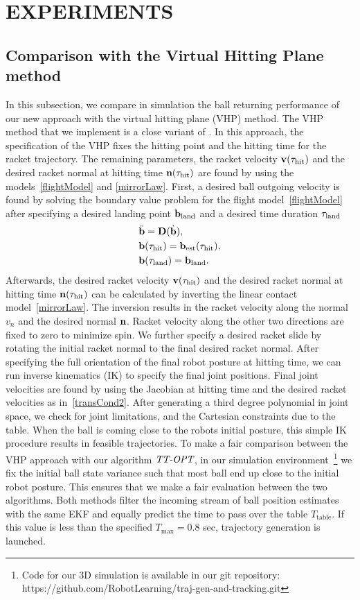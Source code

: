 \section{EXPERIMENTS}\label{results}

\subsection{Comparison with the Virtual Hitting Plane method}

In this subsection, we compare in simulation the ball returning performance of our new approach with the virtual hitting plane (VHP) method. The VHP method that we implement is a close variant of \cite{Muelling13}. In this approach, the specification of the VHP fixes the hitting point and the hitting time for the racket trajectory. The remaining parameters, the racket velocity $\boldsymbol{\mathrm{v}}(\tau_{\mathrm{hit}})$ and the desired racket normal at hitting time $\boldsymbol{\mathrm{n}}(\tau_{\mathrm{hit}})$ are found by using the models~\eqref{flightModel} and \eqref{mirrorLaw}. First, a desired ball outgoing velocity is found by solving the boundary value problem for the flight model~\eqref{flightModel} after specifying a desired landing point $\boldsymbol{\mathrm{b}}_{\mathrm{land}}$ and a desired time duration $\tau_{\mathrm{land}}$
%
\begin{align}
&\ddot{\boldsymbol{\mathrm{b}}} = \boldsymbol{\mathrm{D}}(\dot{\boldsymbol{\mathrm{b}}}), \\
&\boldsymbol{\mathrm{b}}(\tau_{\mathrm{hit}}) = \boldsymbol{\mathrm{b}}_{\mathrm{est}}(\tau_{\mathrm{hit}}), \\
&\boldsymbol{\mathrm{b}}(\tau_{\mathrm{land}}) = \boldsymbol{\mathrm{b}}_{\mathrm{land}}.
\label{bvp}
\end{align}
%
Afterwards, the desired racket velocity $\boldsymbol{\mathrm{v}}(\tau_{\mathrm{hit}})$ and the desired racket normal at hitting time $\boldsymbol{\mathrm{n}}(\tau_{\mathrm{hit}})$ can be calculated by inverting the linear contact model~\eqref{mirrorLaw}. The inversion results in the racket velocity along the normal $v_n$ and the desired normal $\boldsymbol{\mathrm{n}}$. Racket velocity along the other two directions are fixed to zero to minimize spin.
%
We further specify a desired racket slide by rotating the initial racket normal to the final desired racket normal. After specifying the full orientation of the final robot posture at hitting time, we can run inverse kinematics (IK) to specify the final joint positions. Final joint velocities are found by using the Jacobian at hitting time and the desired racket velocities as in~\eqref{transCond2}. After generating a third degree polynomial in joint space, we check for joint limitations, and the Cartesian constraints due to the table. When the ball is coming close to the robots initial posture, this simple IK procedure results in feasible trajectories.
%
To make a fair comparison between the VHP approach with our algorithm $\emph{TT-OPT}$, in our simulation environment~\footnote{Code for our 3D simulation is available in our git repository: https://github.com/RobotLearning/traj-gen-and-tracking.git} we fix the initial ball state variance such that most ball end up close to the initial robot posture. This ensures that we make a fair evaluation between the two algorithms. Both methods filter the incoming stream of ball position estimates with the same EKF and equally predict the time to pass over the table $T_{\mathrm{table}}$. If this value is less than the specified $T_{\mathrm{max}} = 0.8$ sec, trajectory generation is launched.

